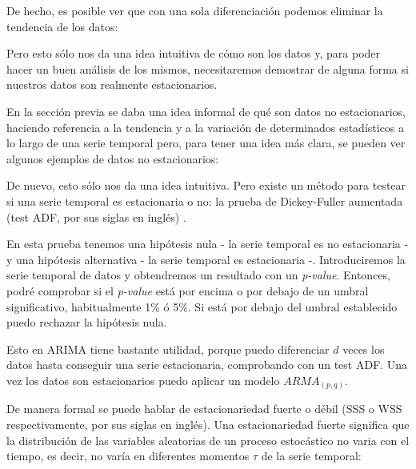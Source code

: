 De hecho, es posible ver que con una sola diferenciación podemos eliminar la tendencia de los datos:


Pero esto sólo nos da una idea intuitiva de cómo son los datos y, para poder hacer un buen análisis de los mismos, necesitaremos demostrar de alguna forma si nuestros datos son realmente estacionarios. 

En la sección previa se daba una idea informal de qué son datos no estacionarios, haciendo referencia a la tendencia y a la variación de determinados estadísticos a lo largo de una serie temporal pero, para tener una idea más clara, se pueden ver algunos ejemplos de datos no estacionarios:



De nuevo, esto sólo nos da una idea intuitiva. Pero existe un método para testear si una serie temporal es estacionaria o no: la prueba de Dickey-Fuller aumentada (test ADF, por sus siglas en inglés) \citep{wiki:Dickey-Fuller}. 

En esta prueba tenemos una hipótesis nula - la serie temporal es no estacionaria - y una hipótesis alternativa - la serie temporal es estacionaria -. Introduciremos la serie temporal de datos y obtendremos un resultado con un \emph{p-value}. Entonces, podré comprobar si el \emph{p-value} está por encima o por debajo de un umbral significativo, habitualmente 1\% ó 5\%. Si está por debajo del umbral establecido puedo rechazar la hipótesis nula.

Esto en ARIMA tiene bastante utilidad, porque puedo diferenciar $d$ veces los datos hasta conseguir una serie estacionaria, comprobando con un test ADF. Una vez los datos son estacionarios puedo aplicar un modelo $ARMA_{(p, q)}$.

De manera formal se puede hablar de estacionariedad fuerte o débil (SSS o WSS respectivamente, por sus siglas en inglés)\citep{wiki:proceso_estacionario_en}. Una estacionariedad fuerte significa que la distribución de las variables aleatorias de un proceso estocástico no varia con el tiempo, es decir, no varía en diferentes momentos  $\tau$ de la serie temporal:

